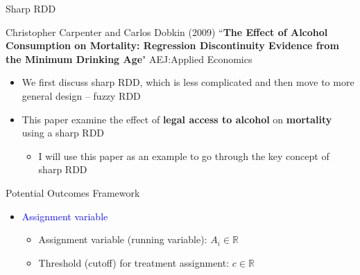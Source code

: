 \documentclass[dvipsnames,hyperref={pdfpagelabels=false}]{beamer}
\begin{document}
\begin{frame}{Sharp RDD}
	
	Christopher Carpenter and Carlos Dobkin (2009) ``\textbf{The Effect of Alcohol Consumption on Mortality: Regression Discontinuity Evidence from the Minimum Drinking Age}" AEJ:Applied Economics
	
	\begin{itemize}
						\vspace{0.2cm}
		\item We first discuss sharp RDD, which is less complicated and then move to more general design -- fuzzy RDD
				\vspace{0.2cm}
		\item This paper examine the effect of \textbf{legal access to alcohol} on \textbf{mortality} using a sharp RDD
		\vspace{0.2cm}
			\begin{itemize}
		\item I will use this paper as an example to go through the key concept of sharp RDD
			\end{itemize}
	\end{itemize}
\end{frame}


\begin{frame}{Potential Outcomes Framework}{}
	
		\begin{itemize} 
	\item \textcolor{blue}{Assignment variable} 
		\vspace{0.2cm}
				\begin{itemize} 
		\item Assignment variable (running variable): $A_i\in \mathbb{R}$
		\vspace{0.2cm}
		\item Threshold (cutoff) for treatment assignment: $c\in \mathbb{R}$
		\vspace{0.2cm}
			\end{itemize}
		
	
		
	\end{itemize}
\end{frame}
\end{document}
